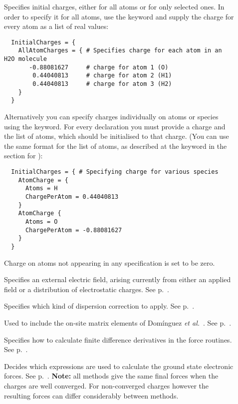 \begin{description}
\item[] Specifies initial charges, either for all atoms or
  for only selected ones. In order to specify it for all atoms, use the keyword
   and supply the charge for every atom as a list of real
  values:
\begin{verbatim}
  InitialCharges = {
    AllAtomCharges = { # Specifies charge for each atom in an H2O molecule
       -0.88081627     # charge for atom 1 (O)
        0.44040813     # charge for atom 2 (H1)
        0.44040813     # charge for atom 3 (H2)
    }
  }
\end{verbatim}
  Alternatively you can specify charges individually on atoms or
  species using the  keyword. For every 
  declaration you must provide a charge and the list of atoms,
  which should be initialised to that charge. (You can use the
  same format for the list of atoms, as described at the
   keyword in the section for ):
\begin{verbatim}
  InitialCharges = { # Specifying charge for various species
    AtomCharge = {
      Atoms = H
      ChargePerAtom = 0.44040813
    }
    AtomCharge {
      Atoms = O
      ChargePerAtom = -0.88081627
    }
  }
\end{verbatim}
  Charge on atoms not appearing in any 
  specification is set to be zero.


\item[] Specifies an external electric field,
  arising currently from either an applied field or a distribution of
  electrostatic charges. See p.~.

\item[] Specifies which kind of dispersion correction
  to apply. See p.~.

\item[] Used to include the on-site matrix elements of
  Dom\'inguez {\it et al.}~\cite{dominguez15}. See p.~.

\item[] Specifies how to calculate finite difference
  derivatives in the force routines. See p.~.

\item[] Decides which expressions are used to calculate the ground state
  electronic forces.  See p.~. \textbf{Note:} all methods give the same final
  forces when the charges are well converged. For non-converged charges however the resulting forces
  can differ considerably between methods.


\end{description}
